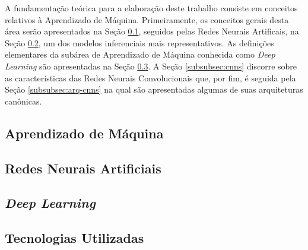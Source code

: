 A fundamentação teórica para a elaboração deste trabalho consiste em conceitos relativos à Aprendizado de Máquina. Primeiramente, os conceitos gerais desta área serão apresentados na Seção \ref{subsec:ml}, seguidos pelas Redes Neurais Artificais, na Seção \ref{subsec:rna}, um dos modelos inferenciais mais representativos.
As definições elementares da subárea de Aprendizado de Máquina conhecida como \emph{Deep Learning} são apresentadas na Seção \ref{subsec:dl}. A Seção \ref{subsubsec:cnns} discorre sobre as características das Redes Neurais Convolucionais que, por fim, é seguida pela Seção \ref{subsubsec:arq-cnns} na qual são apresentadas algumas de suas arquiteturas canônicas.


\subsection{Aprendizado de Máquina}
\label{subsec:ml}


\subsection{Redes Neurais Artificiais}
\label{subsec:rna}


\subsection{\emph{Deep Learning}}
\label{subsec:dl}


\subsection{Tecnologias Utilizadas}
